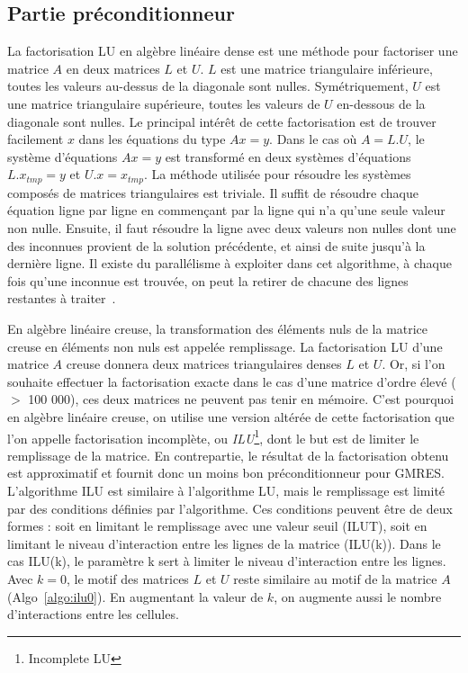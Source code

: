 \subsection{Partie préconditionneur}
La factorisation LU en algèbre linéaire dense est une méthode pour factoriser une matrice $A$ en deux matrices $L$ et $U$.
%
$L$ est une matrice triangulaire inférieure, toutes les valeurs au-dessus de la diagonale sont nulles.
%
Symétriquement, $U$ est une matrice triangulaire supérieure, toutes les valeurs de $U$ en-dessous de la diagonale sont nulles.
%
Le principal intérêt de cette factorisation est de trouver facilement $x$ dans les équations du type $Ax=y$.
%
Dans le cas où $A=L.U$, le système d'équations $Ax=y$ est transformé en deux systèmes d'équations $L.x_{tmp}=y$ et $U.x=x_{tmp}$.
%
La méthode utilisée pour résoudre les systèmes composés de matrices triangulaires est triviale.
%
Il suffit de résoudre chaque équation ligne par ligne en commençant par la ligne qui n'a qu'une seule valeur non nulle.
%
Ensuite, il faut résoudre la ligne avec deux valeurs non nulles dont une des inconnues provient de la solution précédente, et ainsi de suite jusqu'à la dernière ligne.
%
Il existe du parallélisme à exploiter dans cet algorithme, à chaque fois qu'une inconnue est trouvée, on peut la retirer de chacune des lignes restantes à traiter~\cite{plasma_lu}.

En algèbre linéaire creuse, la transformation des éléments nuls de la matrice creuse en éléments non nuls est appelée remplissage.
%
La factorisation LU d'une matrice $A$ creuse donnera deux matrices triangulaires denses $L$ et $U$.
%
Or, si l'on souhaite effectuer la factorisation exacte dans le cas d'une matrice d'ordre élevé ($>$ 100 000), ces deux matrices ne peuvent pas tenir en mémoire.
%
C'est pourquoi en algèbre linéaire creuse, on utilise une version altérée de cette factorisation que l'on appelle factorisation incomplète, ou {\em ILU}\footnote{Incomplete LU}, dont le but est de limiter le remplissage de la matrice.
%
En contrepartie, le résultat de la factorisation obtenu est approximatif et fournit donc un moins bon préconditionneur pour GMRES.
%
L'algorithme ILU est similaire à l'algorithme LU, mais le remplissage est limité par des conditions définies par l'algorithme.
%
Ces conditions peuvent être de deux formes : soit en limitant le remplissage avec une valeur seuil (ILUT\cite{saad1994ilut}), soit en limitant le niveau d'interaction entre les lignes de la matrice (ILU(k)).
%
Dans le cas ILU(k), le paramètre k sert à limiter le niveau d'interaction entre les lignes.
%
Avec $k=0$, le motif des matrices $L$ et $U$ reste similaire au motif de la matrice $A$ (Algo~\ref{algo:ilu0}).
%
En augmentant la valeur de $k$, on augmente aussi le nombre d'interactions entre les cellules.


